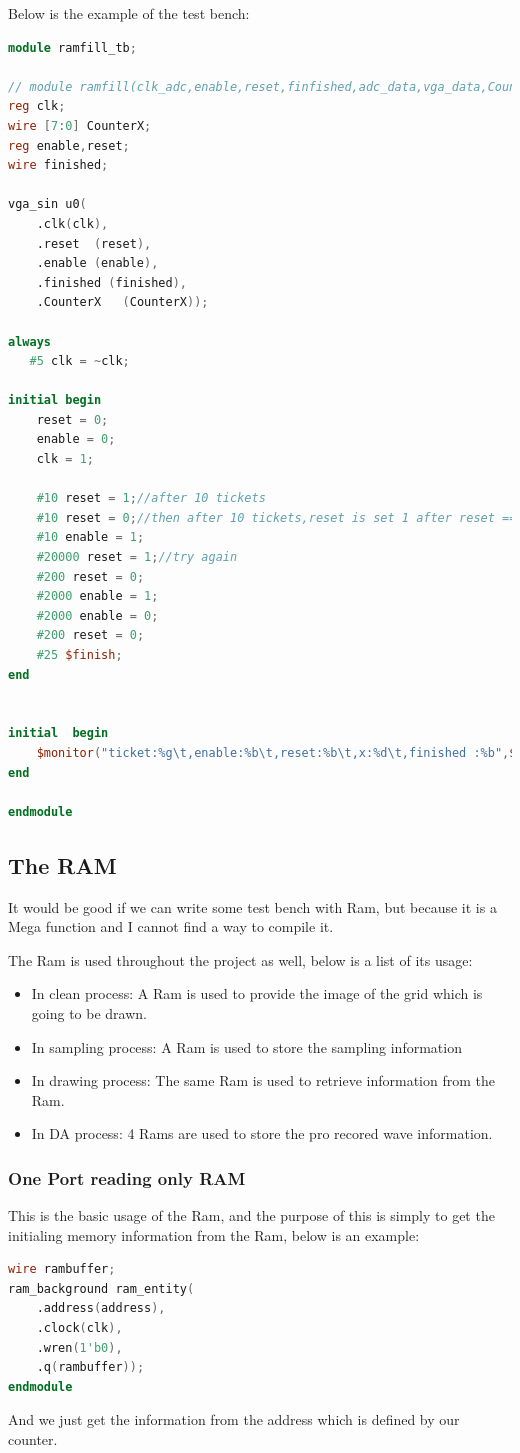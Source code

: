 \documentclass[11pt]{scrartcl}
\begin{document}
Below is the example of the test bench:
\begin{lstlisting}[language=Verilog]
module ramfill_tb;

// module ramfill(clk_adc,enable,reset,finfished,adc_data,vga_data,CounterX);
reg clk;
wire [7:0] CounterX;
reg enable,reset;
wire finished;

vga_sin u0(
	.clk(clk), 
	.reset	(reset),
	.enable (enable),
	.finished (finished), 
	.CounterX	(CounterX));

always  
   #5 clk = ~clk; 
    
initial begin
	reset = 0;
	enable = 0;
	clk = 1;

	#10 reset = 1;//after 10 tickets
	#10 reset = 0;//then after 10 tickets,reset is set 1 after reset == 1 is kept for 10 tickets
	#10 enable = 1;
	#20000 reset = 1;//try again
	#200 reset = 0;
	#2000 enable = 1;
	#2000 enable = 0;
	#200 reset = 0;
	#25 $finish; 
end


initial  begin
    $monitor("ticket:%g\t,enable:%b\t,reset:%b\t,x:%d\t,finished :%b",$time,enable,reset,CounterX,finished); 
end 

endmodule
\end{lstlisting}

\subsection{The RAM}
It would be good if we can write some test bench with Ram, but because it is a Mega function and I cannot find a way to compile it.


The Ram is used throughout the project as well, below is a list of its usage:
\begin{itemize}
    \item In clean process: A Ram is used to provide the image of the grid which is going to be drawn.
    \item In sampling process: A Ram is used to store the sampling information
    \item In drawing process: The same Ram is used to retrieve information from the Ram.
    \item In DA process: 4 Rams are used to store the pro recored wave information. 
    \end{itemize}
\subsubsection{One Port reading only RAM}
This is the basic usage of the Ram, and the purpose of this is simply to get the initialing memory information from the Ram, below is an example:
\begin{lstlisting}[language=Verilog]
wire rambuffer;
ram_background ram_entity(
 	.address(address),
 	.clock(clk),
 	.wren(1'b0),
 	.q(rambuffer));
endmodule
\end{lstlisting}
And we just get the information from the address which is defined by our counter.
\end{document}
